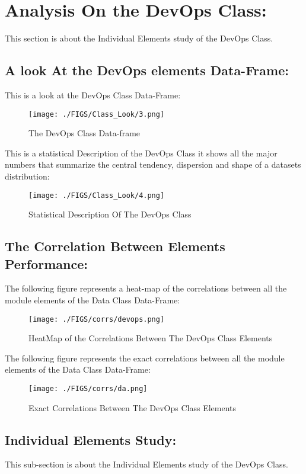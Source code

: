 \documentclass[12pt]{extreport}
\begin{document}
\section{Analysis On the DevOps Class:}
This section is about the Individual Elements study of the DevOps Class. 

\subsection{A look At the DevOps elements Data-Frame:}

This is a look at the DevOps Class Data-Frame:

\begin{figure}[H]
	\centering
	\texttt{[image: ./FIGS/Class\_Look/3.png]}
	\caption{The DevOps Class Data-frame}
	\label{fig:18}
\end{figure}


This is a statistical Description of the DevOps Class it shows all the major numbers that summarize the central tendency, dispersion and shape of a datasets distribution:

\begin{figure}[H]
	\centering
	\texttt{[image: ./FIGS/Class\_Look/4.png]}
	\caption{Statistical Description Of The DevOps Class}
	\label{fig:19}
\end{figure}

\subsection{The Correlation Between Elements Performance:}

The following figure represents a heat-map of the correlations between all the module elements of the Data Class Data-Frame:
\begin{figure}[H]
	\centering
	\texttt{[image: ./FIGS/corrs/devops.png]}
	\caption{HeatMap of the Correlations Between The DevOps Class Elements}
	\label{fig:20}
\end{figure}


The following figure represents the exact correlations between all the module elements of the Data Class Data-Frame:
\begin{figure}[H]
	\centering
	\texttt{[image: ./FIGS/corrs/da.png]}
	\caption{Exact Correlations Between The DevOps Class Elements}
	\label{fig:a}
\end{figure}

\subsection{Individual Elements Study:}
This sub-section is about the Individual Elements study of the DevOps Class. 
\end{document}
